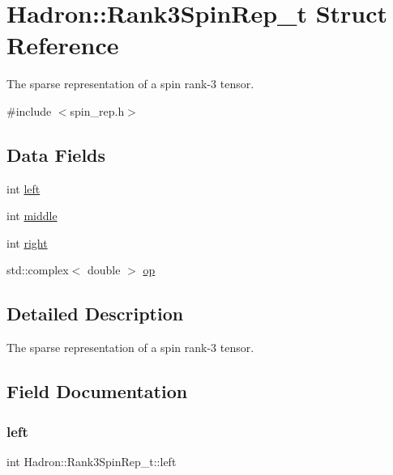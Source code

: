 \hypertarget{structHadron_1_1Rank3SpinRep__t}{}\section{Hadron\+:\+:Rank3\+Spin\+Rep\+\_\+t Struct Reference}
\label{structHadron_1_1Rank3SpinRep__t}


The sparse representation of a spin rank-\/3 tensor.  




{\ttfamily \#include $<$spin\+\_\+rep.\+h$>$}

\subsection*{Data Fields}
\begin{DoxyCompactItemize}
\item 
int \mbox{\hyperlink{structHadron_1_1Rank3SpinRep__t_ae6ad0c9e3a7bcbddd43196cf554ae86a}{left}}
\item 
int \mbox{\hyperlink{structHadron_1_1Rank3SpinRep__t_a5901db603fb0f90ff5d21e2a2200f113}{middle}}
\item 
int \mbox{\hyperlink{structHadron_1_1Rank3SpinRep__t_a4c75ba1e0c96a5d679368619cbcbbcf0}{right}}
\item 
std\+::complex$<$ double $>$ \mbox{\hyperlink{structHadron_1_1Rank3SpinRep__t_aef54e280db29fb78a40da50a1009c4d7}{op}}
\end{DoxyCompactItemize}


\subsection{Detailed Description}
The sparse representation of a spin rank-\/3 tensor. 

\subsection{Field Documentation}
\mbox{\label{structHadron_1_1Rank3SpinRep__t_ae6ad0c9e3a7bcbddd43196cf554ae86a}} 
\subsubsection{\texorpdfstring{left}{left}}
{\footnotesize\ttfamily int Hadron\+::\+Rank3\+Spin\+Rep\+\_\+t\+::left}

